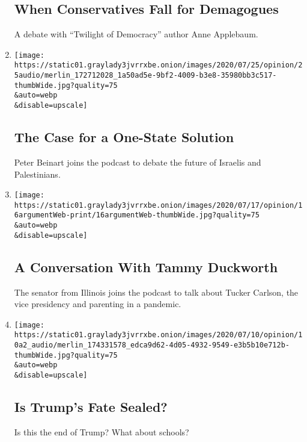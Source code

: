 \begin{enumerate}
  \hypertarget{when-conservatives-fall-for-demagogues}{%
  \subsection{When Conservatives Fall for
  Demagogues}\label{when-conservatives-fall-for-demagogues}}

  A debate with ``Twilight of Democracy'' author Anne Applebaum.
\item
  \href{/2020/07/23/opinion/the-argument-israel-palestinian.html}{}

  \texttt{[image: https://static01.graylady3jvrrxbe.onion/images/2020/07/25/opinion/25audio/merlin\_172712028\_1a50ad5e-9bf2-4009-b3e8-35980bb3c517-thumbWide.jpg?quality=75\\\&auto=webp\\\&disable=upscale]}

  \hypertarget{the-case-for-a-one-state-solution}{%
  \subsection{The Case for a One-State
  Solution}\label{the-case-for-a-one-state-solution}}

  Peter Beinart joins the podcast to debate the future of Israelis and
  Palestinians.
\item
  \href{/2020/07/16/opinion/the-argument-tammy-duckworth.html}{}

  \texttt{[image: https://static01.graylady3jvrrxbe.onion/images/2020/07/17/opinion/16argumentWeb-print/16argumentWeb-thumbWide.jpg?quality=75\\\&auto=webp\\\&disable=upscale]}

  \hypertarget{a-conversation-with-tammy-duckworth}{%
  \subsection{A Conversation With Tammy
  Duckworth}\label{a-conversation-with-tammy-duckworth}}

  The senator from Illinois joins the podcast to talk about Tucker
  Carlson, the vice presidency and parenting in a pandemic.
\item
  \href{/2020/07/09/opinion/is-trumps-fate-sealed.html}{}

  \texttt{[image: https://static01.graylady3jvrrxbe.onion/images/2020/07/10/opinion/10a2\_audio/merlin\_174331578\_edca9d62-4d05-4932-9549-e3b5b10e712b-thumbWide.jpg?quality=75\\\&auto=webp\\\&disable=upscale]}

  \hypertarget{is-trumps-fate-sealed}{%
  \subsection{Is Trump's Fate Sealed?}\label{is-trumps-fate-sealed}}

  Is this the end of Trump? What about schools?
\end{enumerate}

